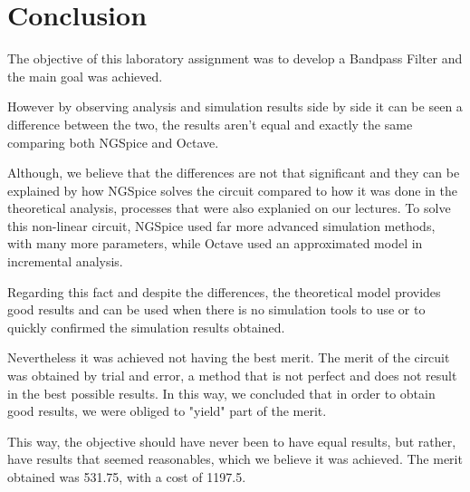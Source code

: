 \newpage
\section{Conclusion}
\label{sec:conclusion}

\hspace{0,5cm} The objective of this laboratory assignment was to develop a Bandpass Filter and the main goal was achieved. 

\par However by observing analysis and simulation results side by side it can be seen a difference between the two, the results aren't equal and exactly the same comparing both NGSpice and Octave. 
\par Although, we believe that the differences are not that significant and they can be explained by how NGSpice solves the circuit compared to how it was done in the theoretical analysis, processes that were also explanied on our lectures. To solve this non-linear circuit, NGSpice used far more advanced simulation methods, with many more parameters, while Octave used an approximated model in incremental analysis. 
\par Regarding this fact and despite the differences, the theoretical model provides good results and can be used when there is no simulation tools to use or to quickly confirmed the simulation results obtained.

\par Nevertheless it was achieved not having the best merit. The merit of the circuit was obtained by trial and error, a method that is not perfect and does not result in the best possible results. In this way, we concluded that in order to obtain good results, we were obliged to "yield" part of the merit.

\par This way, the objective should have never been to have equal results, but rather, have results that seemed reasonables, which we believe it was achieved. The merit obtained was 531.75, with a cost of 1197.5.



